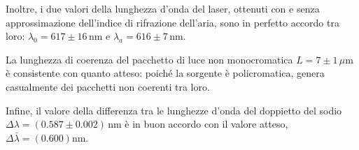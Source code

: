 \documentclass[]{article}
\begin{document}
Inoltre, i due valori della lunghezza d'onda del laser, ottenuti con e senza approssimazione dell'indice di rifrazione dell'aria, sono in perfetto accordo tra loro: $\lambda_{0} = 617 \pm 16 \, \text{nm}$ e $ \lambda_{a} =616 \pm 7 \, \text{nm}$.

La lunghezza di coerenza del pacchetto di luce non monocromatica $L= 7 \pm 1 \, \mu \text{m}$ è consistente con quanto atteso: poiché la sorgente è policromatica, genera casualmente dei pacchetti non coerenti tra loro.

Infine, il valore della differenza tra le lunghezze d'onda del doppietto del sodio $\Delta \lambda = (0.587 \pm 0.002) \, \text{nm}$ è in buon accordo con il valore atteso, $\Delta \bar{\lambda} = (0.600) \text{nm}$.
\end{document}
